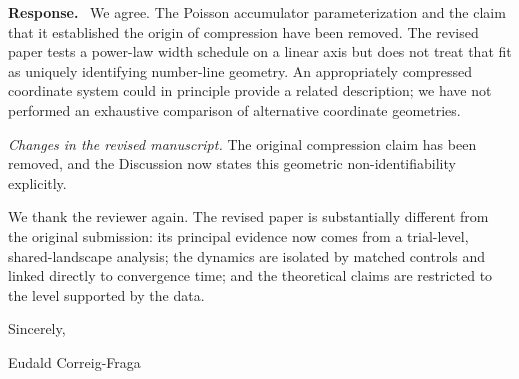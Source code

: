\documentclass[11pt]{article}
\newenvironment{authorresponse}{\par\noindent\textbf{\color{responseblue}Response.}\ }{\par}
\newcommand{\change}[1]{\par\noindent\textit{Changes in the revised manuscript.} #1\par}
\begin{document}
\begin{authorresponse}
We agree. The Poisson accumulator parameterization and the claim that it established the origin of compression have been removed. The revised paper tests a power-law width schedule on a linear axis but does not treat that fit as uniquely identifying number-line geometry. An appropriately compressed coordinate system could in principle provide a related description; we have not performed an exhaustive comparison of alternative coordinate geometries.
\end{authorresponse}

\change{The original compression claim has been removed, and the Discussion now states this geometric non-identifiability explicitly.}

We thank the reviewer again. The revised paper is substantially different from the original submission: its principal evidence now comes from a trial-level, shared-landscape analysis; the dynamics are isolated by matched controls and linked directly to convergence time; and the theoretical claims are restricted to the level supported by the data.

Sincerely,

Eudald Correig-Fraga
\end{document}

